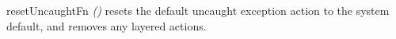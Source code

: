 \begin{descr}
\begin{speccomment}
\item {\cf \small reset\-Uncaught\-Fn \mbox{\cf \small \textit{()}}           } 
resets the default uncaught exception action to the system default, 	  and removes any layered actions.\end{speccomment}
\end{descr}
